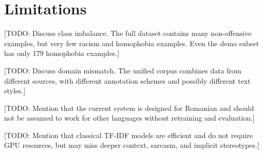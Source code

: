 \section*{Limitations}
\label{sec:limitations}

[TODO: Discuss class imbalance. The full dataset contains many non-offensive examples, but very few racism and homophobia examples. Even the demo subset has only 179 homophobia examples.]

[TODO: Discuss domain mismatch. The unified corpus combines data from different sources, with different annotation schemes and possibly different text styles.]

[TODO: Mention that the current system is designed for Romanian and should not be assumed to work for other languages without retraining and evaluation.]

[TODO: Mention that classical TF-IDF models are efficient and do not require GPU resources, but may miss deeper context, sarcasm, and implicit stereotypes.]
